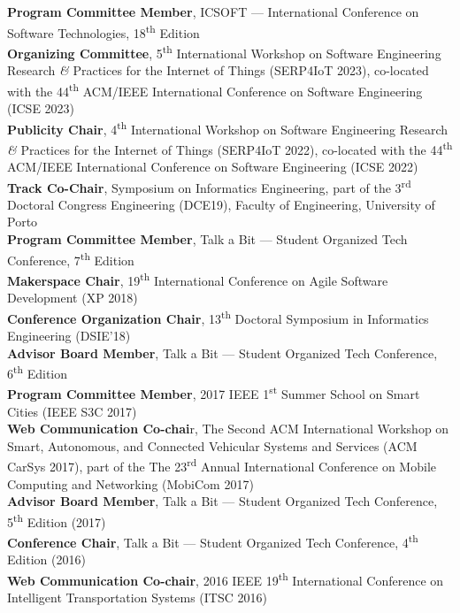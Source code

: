 \documentclass[10pt, a4paper]{article}
\newcommand{\FEUP}{Faculty of Engineering, University of Porto}
\newcommand{\years}[1]{\marginnote{\raggedleft\footnotesize #1}}
\begin{document}
\years{2023} 
\textbf{Program Committee Member}, ICSOFT --- International Conference on Software Technologies, 18\textsuperscript{th} Edition\\[0.42em]
\textbf{Organizing Committee}, 5\textsuperscript{th} International Workshop on Software Engineering Research \textit{\&} Practices for the Internet of Things (SERP4IoT 2023), co-located with the 44\textsuperscript{th} ACM/IEEE International Conference on Software Engineering (ICSE 2023)
\\[0.42em]
\years{2022} \textbf{Publicity Chair}, 4\textsuperscript{th} International Workshop on Software Engineering Research \textit{\&} Practices for the Internet of Things (SERP4IoT 2022), co-located with the 44\textsuperscript{th} ACM/IEEE International Conference on Software Engineering (ICSE 2022)
\\[0.42em]
\years{2019} \textbf{Track Co-Chair}, Symposium on Informatics Engineering, part of the 3\textsuperscript{rd} Doctoral Congress Engineering (DCE19), \FEUP
\\[0.42em]
\textbf{Program Committee Member}, Talk a Bit --- Student Organized Tech Conference, 7\textsuperscript{th} Edition
\\[0.42em]
\years{2018} \textbf{Makerspace Chair}, 19\textsuperscript{th} International Conference on Agile Software Development (XP 2018)
\\[0.42em] 
\textbf{Conference Organization Chair}, 13\textsuperscript{th} Doctoral Symposium in Informatics Engineering (DSIE'18)
\\[0.42em] 
\textbf{Advisor Board Member}, Talk a Bit --- Student Organized Tech Conference, 6\textsuperscript{th} Edition
\\[0.42em]
\years{2017} \textbf{Program Committee Member}, 2017 IEEE 1\textsuperscript{st} Summer School on Smart Cities (IEEE S3C 2017)
\\[0.42em]
\textbf{Web Communication Co-chai}r, The Second ACM International Workshop on Smart, Autonomous, and Connected Vehicular Systems and Services (ACM CarSys 2017), part of the The 23\textsuperscript{rd} Annual International Conference on Mobile Computing and Networking (MobiCom 2017)
\\[0.42em]
\textbf{Advisor Board Member}, Talk a Bit --- Student Organized Tech Conference, 5\textsuperscript{th} Edition (2017)
\\[0.42em]
\years{2016} \textbf{Conference Chair}, Talk a Bit --- Student Organized Tech Conference, 4\textsuperscript{th} Edition (2016)
\\[0.42em]
\textbf{Web Communication Co-chair}, 2016 IEEE 19\textsuperscript{th} International Conference on Intelligent Transportation Systems (ITSC 2016)
\end{document}
